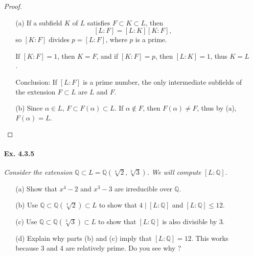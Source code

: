 \documentclass[11pt,a4paper]{article}
\newcommand{\Q}{\mathbb{Q}}
\begin{document}
\begin{proof}
\begin{enumerate}
\item[(a)]
If a subfield  $K$ of $L$ satisfies  $F \subset K \subset L$, then
$$[L:F] = [L:K][K:F],$$ 
so $[K:F]$ divides $p = [L:F]$, where $p$ is a prime.

If $[K:F] = 1$, then $K = F$, and if $[K:F]=p$, then $[L:K]= 1$, thus $K = L$.

Conclusion: If  $[L:F]$ is a prime number, the only intermediate subfields of the extension $F \subset L$  are $L$ and $F$.


\item[(b)] Since $\alpha \in L$, $F \subset F(\alpha) \subset L$.
If $\alpha \not \in F$, then $F(\alpha) \neq F$, thus by (a), $F(\alpha) = L$.

\end{enumerate}
\end{proof}

\paragraph{Ex. 4.3.5}

{\it Consider the extension $\Q \subset L = \Q(\sqrt[4]{2},\sqrt[3]{3})$. We will compute $[L:\Q]$.
\begin{enumerate}
\item[(a)] Show that $x^4 - 2$ and $x^3 - 3$ are irreducible over $\Q$.
\item[(b)] Use $\Q \subset \Q(\sqrt[4]{2}) \subset L$ to show that $4 \mid [L:\Q]$ and $[L:\Q] \leq 12$.
\item[(c)] Use $\Q \subset \Q(\sqrt[3]{3}) \subset L$ to show that $[L : \Q]$ is also divisible by 3.
\item[(d)] Explain why parts (b) and (c) imply that $[L:\Q] = 12$. This works because 3 and 4 are relatively prime. Do you see why ?
\end{enumerate}
}
\end{document}
